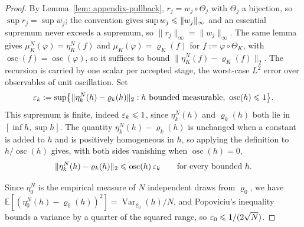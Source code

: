 \documentclass{article}
\begin{document}
\begin{proof}
By Lemma~\ref{lem: appendix-pullback}, $r_j=w_j\circ\Theta_j$ with $\Theta_j$ a bijection, so $\sup r_j=\sup w_j$; the convention gives $\sup w_j\leqslant\lVert w_j\rVert_\infty$ and an essential supremum never exceeds a supremum, so $\lVert r_j\rVert_\infty=\lVert w_j\rVert_\infty$. The same lemma gives $\mu_K^N(\varphi)=\eta_K^N(f)$ and $\mu_K(\varphi)=\varrho_K(f)$ for $f:=\varphi\circ\Theta_K$, with $\operatorname{osc}(f)=\operatorname{osc}(\varphi)$, so it suffices to bound $\lVert\eta_K^N(f)-\varrho_K(f)\rVert_2$. The recursion is carried by one scalar per accepted stage, the worst-case $L^2$ error over observables of unit oscillation. Set
\begin{equation*}
    \varepsilon_k := \sup\bigl\{\lVert\eta_k^N(h)-\varrho_k(h)\rVert_2 : h \text{ bounded measurable},\ \operatorname{osc}(h)\leqslant1\bigr\}.
\end{equation*}
This supremum is finite, indeed $\varepsilon_k\leqslant1$, since $\eta_k^N(h)$ and $\varrho_k(h)$ both lie in $[\inf h,\sup h]$. The quantity $\eta_k^N(h)-\varrho_k(h)$ is unchanged when a constant is added to $h$ and is positively homogeneous in $h$, so applying the definition to $h/\operatorname{osc}(h)$ gives, with both sides vanishing when $\operatorname{osc}(h)=0$,
\begin{equation}
    \lVert\eta_k^N(h)-\varrho_k(h)\rVert_2 \leqslant \operatorname{osc}(h)\,\varepsilon_k
    \qquad\text{for every bounded } h.
    \label{eq: appendix-eps}
\end{equation}

Since $\eta_0^N$ is the empirical measure of $N$ independent draws from $\varrho_0$, we have $\mathbb E[(\eta_0^N(h)-\varrho_0(h))^2]=\operatorname{Var}_{\varrho_0}(h)/N$, and Popoviciu's inequality bounds a variance by a quarter of the squared range, so $\varepsilon_0\leqslant 1/(2\sqrt N)$.


\end{proof}
\end{document}
